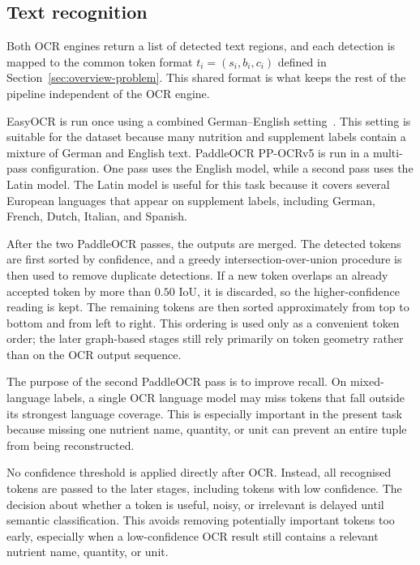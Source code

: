 \subsection{Text recognition}\label{sec:ocr-recognition}

Both OCR engines return a list of detected text regions, and each detection is mapped to the common token format \(t_i = (s_i, b_i, c_i)\) defined in Section~\ref{sec:overview-problem}. This shared format is what keeps the rest of the pipeline independent of the OCR engine.

EasyOCR is run once using a combined German--English setting~\cite{easyocr}. This setting is suitable for the dataset because many nutrition and supplement labels contain a mixture of German and English text. PaddleOCR PP-OCRv5 is run in a multi-pass configuration. One pass uses the English model, while a second pass uses the Latin model. The Latin model is useful for this task because it covers several European languages that appear on supplement labels, including German, French, Dutch, Italian, and Spanish.

After the two PaddleOCR passes, the outputs are merged. The detected tokens are first sorted by confidence, and a greedy intersection-over-union procedure is then used to remove duplicate detections. If a new token overlaps an already accepted token by more than \(0.50\) IoU, it is discarded, so the higher-confidence reading is kept. The remaining tokens are then sorted approximately from top to bottom and from left to right. This ordering is used only as a convenient token order; the later graph-based stages still rely primarily on token geometry rather than on the OCR output sequence.

The purpose of the second PaddleOCR pass is to improve recall. On mixed-language labels, a single OCR language model may miss tokens that fall outside its strongest language coverage. This is especially important in the present task because missing one nutrient name, quantity, or unit can prevent an entire tuple from being reconstructed.

No confidence threshold is applied directly after OCR. Instead, all recognised tokens are passed to the later stages, including tokens with low confidence. The decision about whether a token is useful, noisy, or irrelevant is delayed until semantic classification. This avoids removing potentially important tokens too early, especially when a low-confidence OCR result still contains a relevant nutrient name, quantity, or unit.

